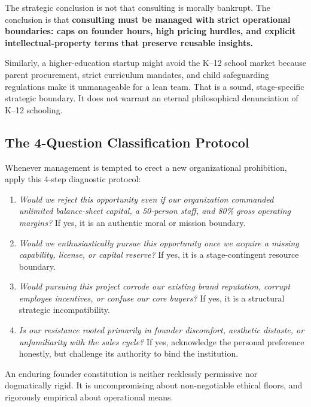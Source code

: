 The strategic conclusion is not that consulting is morally bankrupt. The conclusion is that \textbf{consulting must be managed with strict operational boundaries: caps on founder hours, high pricing hurdles, and explicit intellectual-property terms that preserve reusable insights.}

Similarly, a higher-education startup might avoid the K--12 school market because parent procurement, strict curriculum mandates, and child safeguarding regulations make it unmanageable for a lean team. That is a sound, stage-specific strategic boundary. It does not warrant an eternal philosophical denunciation of K--12 schooling.

\subsection{The 4-Question Classification Protocol}

Whenever management is tempted to erect a new organizational prohibition, apply this 4-step diagnostic protocol:

\begin{enumerate}[leftmargin=12pt,itemsep=2.5pt,topsep=1pt,parsep=0pt]
  \item \textit{Would we reject this opportunity even if our organization commanded unlimited balance-sheet capital, a 50-person staff, and 80\% gross operating margins?} If yes, it is an authentic moral or mission boundary.
  \item \textit{Would we enthusiastically pursue this opportunity once we acquire a missing capability, license, or capital reserve?} If yes, it is a stage-contingent resource boundary.
  \item \textit{Would pursuing this project corrode our existing brand reputation, corrupt employee incentives, or confuse our core buyers?} If yes, it is a structural strategic incompatibility.
  \item \textit{Is our resistance rooted primarily in founder discomfort, aesthetic distaste, or unfamiliarity with the sales cycle?} If yes, acknowledge the personal preference honestly, but challenge its authority to bind the institution.
\end{enumerate}

An enduring founder constitution is neither recklessly permissive nor dogmatically rigid. It is uncompromising about non-negotiable ethical floors, and rigorously empirical about operational means.
